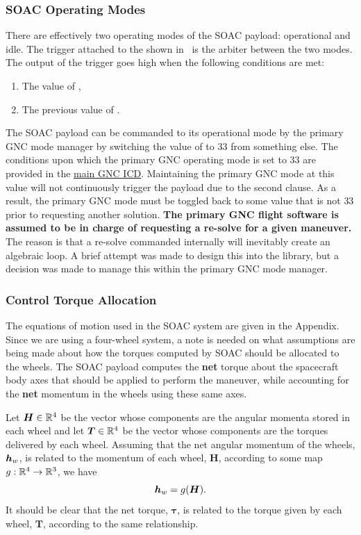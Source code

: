 \documentclass[10pt]{article}
\begin{document}
\subsubsection{SOAC Operating Modes}\label{sec3:op_modes}
There are effectively two operating modes of the SOAC payload: operational and idle. The trigger attached to the  shown in~ is the arbiter between the two modes. The output of the trigger goes high when the following conditions are met:
\begin{enumerate}
\item The value of ,
\item The previous value of .
\end{enumerate}
The SOAC payload can be commanded to its operational mode by the primary GNC mode manager by switching the value of  to $33$ from something else. The conditions upon which the primary GNC operating mode is set to $33$ are provided in the \href{https://drive.google.com/open?id=1wTjmsQdXGk9jmEHy59fZAdBJJ3r1IE4LGFjHT2S5png}{main GNC ICD}. Maintaining the primary GNC mode at this value will not continuously trigger the payload due to the second clause. As a result, the primary GNC mode must be toggled back to some value that is not $33$ prior to requesting another solution. \textbf{The primary GNC flight software is assumed to be in charge of requesting a re-solve for a given maneuver.} The reason is that a re-solve commanded internally will inevitably create an algebraic loop. A brief attempt was made to design this into the library, but a decision was made to manage this within the primary GNC mode manager. 

\subsubsection{Control Torque Allocation}\label{sec3:allocation}

The equations of motion used in the SOAC system are given in the Appendix. Since we are using a four-wheel system, a note is needed on what assumptions are being made about how the torques computed by SOAC should be allocated to the wheels. The SOAC payload computes the \textbf{net} torque about the spacecraft body axes that should be applied to perform the maneuver, while accounting for the \textbf{net} momentum in the wheels using these same axes. 

Let $\bm{H}\in{\mathbb{R}}^4$ be the vector whose components are the angular momenta stored in each wheel and let $\bm{T}\in{\mathbb{R}}^4$ be the vector whose components are the torques delivered by each wheel. Assuming that the net angular momentum of the wheels, $\bm{h}_w$, is related to the momentum of each wheel, $\bm{H}$, according to some map $g : {\mathbb{R}}^4 \rightarrow {\mathbb{R}}^3$, we have
\begin{equation}
\bm{h}_w = g(\bm{H}).
\end{equation}
It should be clear that the net torque, $\bm{\tau}$, is related to the torque given by each wheel, $\bm{T}$, according to the same relationship. 
\end{document}
